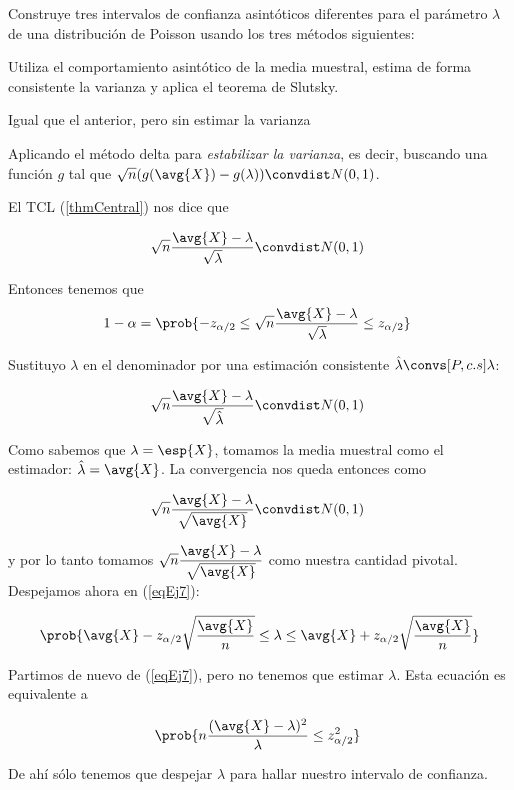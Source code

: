 \pagebreak
\begin{problem}[7]
Construye tres intervalos de confianza asintóticos diferentes para el parámetro $\lambda$ de una distribución de Poisson usando los tres métodos siguientes:

\ppart Utiliza el comportamiento asintótico de la media muestral, estima de forma consistente la varianza y aplica el teorema de Slutsky.

\ppart Igual que el anterior, pero sin estimar la varianza

\ppart Aplicando el método delta para \textit{estabilizar la varianza}, es decir, buscando una función $g$ tal que $\sqrt{n}(g(\avg{X}) - g(\lambda))\convdist N(0,1)$.

\solution

\spart El TCL (\ref{thmCentral}) nos dice que

\[ \sqrt{n}\frac{\avg{X} - \lambda}{\sqrt{\lambda}} \convdist N(0,1) \]

Entonces tenemos que 
\begin{equation}
 1-\alpha = \prob{-z_{\alpha/2}\leq\sqrt{n}\frac{\avg{X} - \lambda}{\sqrt{\lambda}} \leq z_{\alpha/2}} \label{eqEj7}
 \end{equation}

Sustituyo $\lambda$ en el denominador por una estimación consistente $\hat{\lambda}\convs[P, c.s]\lambda$:

\[ \sqrt{n}\frac{\avg{X} - \lambda}{\sqrt{\hat{\lambda}}} \convdist N(0,1) \]

Como sabemos que $\lambda = \esp{X}$, tomamos la media muestral como el estimador: $\hat{\lambda} = \avg{X}$. La convergencia nos queda entonces como


\[ \sqrt{n}\frac{\avg{X} - \lambda}{\sqrt{\avg{X}}} \convdist N(0,1) \]

y por lo tanto tomamos $ \sqrt{n}\dfrac{\avg{X} - \lambda}{\sqrt{\avg{X}}}$ como nuestra cantidad pivotal. Despejamos ahora en (\ref{eqEj7}):

\[ \prob{\avg{X} - z_{\alpha/2} \sqrt{\frac{\avg{X}}{n}} 
	\leq \lambda
	\leq \avg{X} + z_{\alpha/2} \sqrt{\frac{\avg{X}}{n}}}
	\]

\spart
\noindent Partimos de nuevo de (\ref{eqEj7}), pero no tenemos que estimar $\lambda$. Esta ecuación es equivalente a 

\[ \prob{n\frac{(\avg{X}-\lambda)^2}{\lambda} \leq z_{\alpha/2}^2} \]

De ahí sólo tenemos que despejar $\lambda$ para hallar nuestro intervalo de confianza.


\end{problem}
